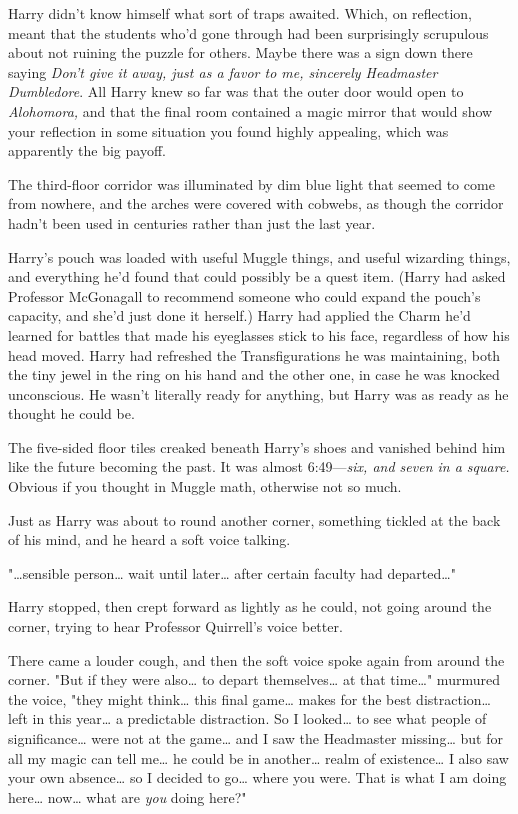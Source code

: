 Harry didn't know himself what sort of traps awaited. Which, on reflection, 
meant that the students who'd gone through had been surprisingly scrupulous 
about not ruining the puzzle for others. Maybe there was a sign down there 
saying \emph{Don't give it away, just as a favor to me, sincerely Headmaster 
Dumbledore}. All Harry knew so far was that the outer door would open to 
\emph{Alohomora,} and that the final room contained a magic mirror that would 
show your reflection in some situation you found highly appealing, which was 
apparently the big payoff.

The third-floor corridor was illuminated by dim blue light that seemed to come 
from nowhere, and the arches were covered with cobwebs, as though the corridor 
hadn't been used in centuries rather than just the last year.

Harry's pouch was loaded with useful Muggle things, and useful wizarding 
things, and everything he'd found that could possibly be a quest item. (Harry 
had asked Professor McGonagall to recommend someone who could expand the 
pouch's capacity, and she'd just done it herself.) Harry had applied the Charm 
he'd learned for battles that made his eyeglasses stick to his face, regardless 
of how his head moved. Harry had refreshed the Transfigurations he was 
maintaining, both the tiny jewel in the ring on his hand and the other one, in 
case he was knocked unconscious. He wasn't literally ready for anything, but 
Harry was as ready as he thought he could be.

The five-sided floor tiles creaked beneath Harry's shoes and vanished behind 
him like the future becoming the past. It was almost 6:49---\emph{six, and seven 
in a square.} Obvious if you thought in Muggle math, otherwise not so much.

Just as Harry was about to round another corner, something tickled at the back 
of his mind, and he heard a soft voice talking.

"{\ldots}sensible person{\ldots} wait until later{\ldots} after certain faculty 
had departed{\ldots}"

Harry stopped, then crept forward as lightly as he could, not going around the 
corner, trying to hear Professor Quirrell's voice better.

There came a louder cough, and then the soft voice spoke again from around the 
corner. "But if they were also{\ldots} to depart themselves{\ldots} at that 
time{\ldots}" murmured the voice, "they might think{\ldots} this final 
game{\ldots} makes for the best distraction{\ldots} left in this year{\ldots} a 
predictable distraction. So I looked{\ldots} to see what people of 
significance{\ldots} were not at the game{\ldots} and I saw the Headmaster 
missing{\ldots} but for all my magic can tell me{\ldots} he could be in 
another{\ldots} realm of existence{\ldots} I also saw your own absence{\ldots} 
so I decided to go{\ldots} where you were. That is what I am doing here{\ldots} 
now{\ldots} what are \emph{you} doing here?"


